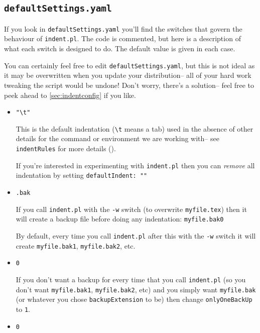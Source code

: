      
 \subsection{\lstinline!defaultSettings.yaml!}
 	If you look in \lstinline!defaultSettings.yaml! you'll find the switches 
 	that govern the behaviour of \lstinline!indent.pl!. The code is commented, 
 	but here is a description of what each switch is designed to do. The default 
 	value is given in each case.
 	 	 	 	 	
 	You can certainly feel free to edit \lstinline!defaultSettings.yaml!, but 
 	this is not ideal as it may be overwritten when you update your distribution--
 	all of your hard work tweaking the script would be undone! Don't worry, 
 	there's a solution-- feel free to peek ahead to \cref{sec:indentconfig} if you like.
 	\begin{itemize}
 		\item[\verbitem{defaultIndent}] \lstinline!"\t"!
 		 		 		 		 					
 		This is the default indentation (\lstinline!\t! means a tab) used in the absence of other details 
 		for the command or environment we are working with-- see \lstinline!indentRules!
 		for more details ().
 		 		 		 		 					
 		If you're interested in experimenting with \lstinline!indent.pl! then you 
 		can \emph{remove} all indentation by setting \lstinline!defaultIndent: ""!
 		\item[\verbitem{backupExtension}] \lstinline!.bak!
 		 		 		 		 					
 		If you call \lstinline!indent.pl! with the \lstinline!-w! switch (to overwrite
 		\lstinline!myfile.tex!) then it will create a backup file before doing 
 		any indentation: \lstinline!myfile.bak0! 
 		 		 		 		 					
 		By default, every time you call \lstinline!indent.pl! after this with 
 		the \lstinline!-w! switch it will create \lstinline!myfile.bak1!, \lstinline!myfile.bak2!, 
 		etc.
 		\item[\verbitem{onlyOneBackUp}] \lstinline!0!
 		 		 		 		 					
 		\label{page:onlyonebackup}
 		If you don't want a backup for every time that you call \lstinline!indent.pl! (so 
 		you don't want \lstinline!myfile.bak1!, \lstinline!myfile.bak2!, etc) and you simply
 		want \lstinline!myfile.bak! (or whatever you chose \lstinline!backupExtension! to be)
 		then change \lstinline!onlyOneBackUp! to \lstinline!1!.
 		\item[\verbitem{indentPreamble}] \lstinline!0!
 		 		 		 		 					

\end{itemize}
